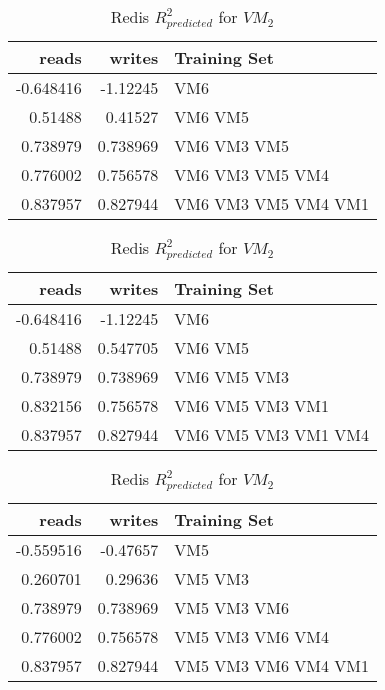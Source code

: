 \begin{table}
\centering
\caption{Redis $R_{predicted}^2$ for $VM_2$}
\begin{tabular}{|r|r|l|} \hline
reads&writes&Training Set\\ \hline
-0.648416 & -1.12245  & VM6 \\ \hline 
0.51488 &  0.41527 & VM6 VM5 \\ \hline 
0.738979 &  0.738969 & VM6 VM3 VM5 \\ \hline 
0.776002 & 0.756578  & VM6 VM3 VM5 VM4 \\ \hline 
0.837957 &  0.827944 & VM6 VM3 VM5 VM4 VM1 \\ \hline 
\hline\end{tabular}
\label{table:redis1}

\centering
\caption{Redis $R_{predicted}^2$ for $VM_2$}
\begin{tabular}{|r|r|l|} \hline
reads&writes&Training Set\\ \hline
-0.648416 & -1.12245  & VM6 \\ \hline 
0.51488 &  0.547705 & VM6 VM5 \\ \hline 
0.738979 & 0.738969  & VM6 VM5 VM3 \\ \hline 
0.832156 &  0.756578 & VM6 VM5 VM3 VM1 \\ \hline 
0.837957 & 0.827944  & VM6 VM5 VM3 VM1 VM4 \\ \hline 
\hline\end{tabular}
\label{table:redis2}

\centering
\caption{Redis $R_{predicted}^2$ for $VM_2$}
\begin{tabular}{|r|r|l|} \hline
reads&writes&Training Set\\ \hline
-0.559516 & -0.47657  & VM5 \\ \hline 
0.260701 &  0.29636 & VM5 VM3 \\ \hline 
0.738979 &  0.738969 & VM5 VM3 VM6 \\ \hline 
0.776002 & 0.756578  & VM5 VM3 VM6 VM4 \\ \hline 
0.837957 & 0.827944  & VM5 VM3 VM6 VM4 VM1 \\ \hline 
\hline\end{tabular}
\label{table:redis3}


\end{table}
